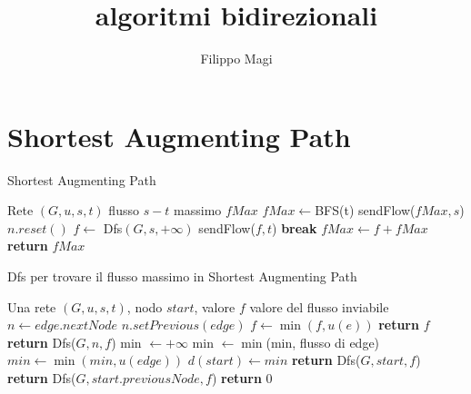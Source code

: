 \documentclass{article}
\title{algoritmi bidirezionali}
\author{Filippo Magi }
\begin{document}
\section{Shortest Augmenting Path}
\begin{algorithm}
\caption{Shortest Augmenting Path}
\begin{algorithmic}
\REQUIRE Rete $(G,u,s,t)$
\ENSURE flusso $s-t$ massimo $fMax$
\STATE $fMax \leftarrow $BFS(t)
\STATE sendFlow($fMax,s$)
\STATE $n.reset()$ 
\ENDFOR
{}
\STATE $f \leftarrow$ Dfs$(G, s, +\infty)$
\STATE sendFlow($f,t$)
\ELSE
\STATE \textbf{break}
\ENDIF
\STATE $fMax \leftarrow f + fMax $
\STATE {}
\ENDWHILE
\STATE \textbf{return} $fMax$
\end{algorithmic}
\end{algorithm}

\begin{algorithm}
\caption{Dfs per trovare il flusso massimo in Shortest Augmenting Path}
\begin{algorithmic}
\REQUIRE Una rete $(G,u,s,t)$, nodo $start$, valore $f$
\ENSURE valore del flusso inviabile 
\STATE $n \leftarrow edge.nextNode$
\STATE $n.setPrevious(edge)$ 
\STATE $f \leftarrow \min(f,u(e))$
\STATE \textbf{return} $f$
\ENDIF
\STATE \textbf{return} Dfs($G,n,f$)
\ENDIF
\ENDFOR
\STATE min $\leftarrow +\infty$
\STATE min $\leftarrow \min$(min, flusso di edge)
\ENDIF
\ENDFOR
{}
\STATE $min \leftarrow \min(min, u(edge))$
\ENDIF
\ENDFOR
\STATE $d(start)\leftarrow min$
\STATE \textbf{return} Dfs($G,start,f$)
\ELSE
\STATE \textbf{return} Dfs($G,start.previousNode,f$)
\ENDIF
\ENDIF
\STATE \textbf{return} 0
\end{algorithmic}
\end{algorithm}
\end{document}
